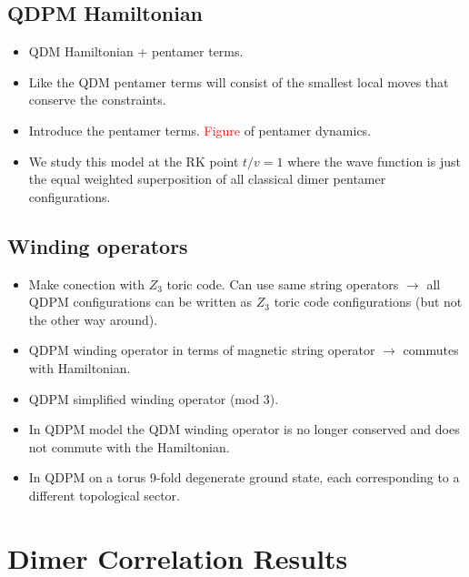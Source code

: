 \documentclass[aps,floatfix,11pt]{revtex4-1}
\begin{document}
    \subsection{QDPM Hamiltonian}
        \begin{itemize}
            \item QDM Hamiltonian + pentamer terms.
            \item Like the QDM pentamer terms will consist of the smallest local moves that conserve
                the constraints.
            \item Introduce the pentamer terms. \textcolor{red}{Figure} of pentamer dynamics.
            \item We study this model at the RK point $t/v = 1$ where the wave function is just the
                equal weighted superposition of all classical dimer pentamer configurations.
        \end{itemize}

    \subsection{Winding operators}
        \begin{itemize}
            \item Make conection with $Z_3$ toric code. Can use same string operators $\rightarrow$
                all QDPM configurations can be written as $Z_3$ toric code configurations (but not
                the other way around).
            \item QDPM winding operator in terms of magnetic string operator $\rightarrow$ commutes
                with Hamiltonian.
            \item QDPM simplified winding operator (mod 3).
            \item In QDPM model the QDM winding operator is no longer conserved and does not commute with the
                Hamiltonian.
            \item In QDPM on a torus 9-fold degenerate ground state, each corresponding to a
                different topological sector.
        \end{itemize}

\clearpage
\section{Dimer Correlation Results}
\end{document}
